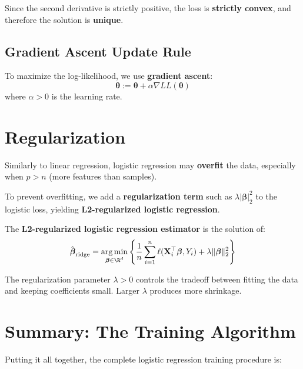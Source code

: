 \documentclass[main.tex]{subfiles}
\begin{document}
Since the second derivative is strictly positive, the loss is \textbf{strictly convex}, and therefore the solution is \textbf{unique}.

\subsection{Gradient Ascent Update Rule}

To maximize the log-likelihood, we use \textbf{gradient ascent}:
$$\boldsymbol{\theta} := \boldsymbol{\theta} + \alpha \nabla LL(\boldsymbol{\theta})$$
where $\alpha > 0$ is the learning rate.

\section{Regularization}

Similarly to linear regression, logistic regression may \textbf{overfit} the data, especially when $p > n$ (more features than samples).

To prevent overfitting, we add a \textbf{regularization term} such as $\lambda |\boldsymbol{\beta}|_2^2$ to the logistic loss, yielding \textbf{L2-regularized logistic regression}.

\begin{definition}
The \textbf{L2-regularized logistic regression estimator} is the solution of:
$$\hat{\boldsymbol{\beta}}_{\text{ridge}} = \underset{\boldsymbol{\beta} \in \R^d}{\arg\min} \left\{ \frac{1}{n} \sum_{i=1}^{n} \ell(\mathbf{X}_i^\top \boldsymbol{\beta}, Y_i) + \lambda \|\boldsymbol{\beta}\|_2^2 \right\}$$
\end{definition}

The regularization parameter $\lambda > 0$ controls the tradeoff between fitting the data and keeping coefficients small. Larger $\lambda$ produces more shrinkage.

\section{Summary: The Training Algorithm}

Putting it all together, the complete logistic regression training procedure is:
\end{document}
